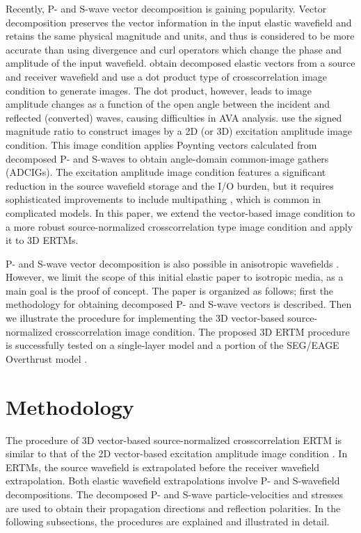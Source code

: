 \documentclass[manuscript,ulem,graphix,revised]{geophysics}
\begin{document}
Recently, P- and S-wave vector decomposition \citep{ma03,zhang07,wenlong_cmp15,wenlong_pv16,zhu17,wenlong17} is gaining popularity. Vector decomposition preserves the vector information in the input elastic wavefield and retains the same physical magnitude and units, and thus is considered to be more accurate than using divergence and curl operators which change the phase and amplitude of the input wavefield. \citet{wang_cl16} obtain decomposed elastic vectors from a source and receiver wavefield and use a dot product type of crosscorrelation image condition to generate images. The dot product, however, leads to image amplitude changes as a function of the open angle between the incident and reflected (converted) waves, causing difficulties in AVA analysis. \citet{wenlong_vct15,wenlong_3d16} use the signed magnitude ratio to construct images by a 2D (or 3D) excitation amplitude image condition. 
This image condition applies Poynting vectors \citep{cerveny01} calculated from decomposed P- and S-waves to obtain angle-domain common-image gathers (ADCIGs). The excitation amplitude image condition features a significant reduction in the source wavefield storage and the I/O burden, but it requires sophisticated improvements to include multipathing \citep{jin15}, which is common in complicated models. In this paper, we extend the vector-based image condition to a more robust source-normalized crosscorrelation type image condition and apply it to 3D ERTMs.

P- and S-wave vector decomposition is also possible in anisotropic wavefields \citep{cheng14,wenlong17}. However, we limit the scope of this initial elastic paper to isotropic media, as a main goal is the proof of concept. The paper is organized as follows; first the methodology for obtaining decomposed P- and S-wave vectors is described. Then we illustrate the procedure for implementing the 3D vector-based source-normalized crosscorrelation image condition.
The proposed 3D ERTM procedure is successfully tested on a single-layer model and a portion of the SEG/EAGE Overthrust model \citep{aminzadeh94}. 

\section{Methodology}

The procedure of 3D vector-based source-normalized crosscorrelation ERTM is similar to that of the 2D vector-based excitation amplitude image condition \citep{wenlong_vct15}. In ERTMs, the source wavefield is extrapolated before the receiver wavefield extrapolation. Both elastic wavefield extrapolations involve P- and S-wavefield decompositions. The decomposed P- and S-wave particle-velocities and stresses are used to obtain their propagation directions and reflection polarities. 
In the following subsections, the procedures are explained and illustrated in detail.
\end{document}
